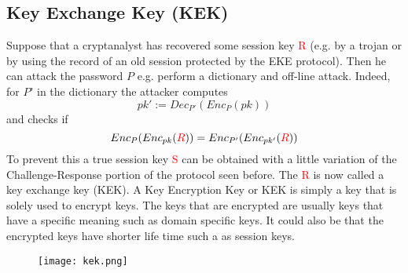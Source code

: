 \documentclass{article}
\begin{document}
\subsection{Key Exchange Key (KEK)}
Suppose that a cryptanalyst has recovered some session key \textcolor{red}{R} (e.g.  by a trojan or by using the record of an old session protected by the EKE protocol).  Then he can attack the password $P$ e.g.  perform a dictionary and off-line attack.  Indeed, for $P’$ in the dictionary the attacker computes
\begin{equation*}
    pk' := Dec_{P'}(Enc_P(pk))
\end{equation*}
and checks if
\begin{equation*}
    Enc_P(Enc_{pk}(\textcolor{red}{R})) = Enc_{P'}(Enc_{pk'}(\textcolor{red}{R}))
\end{equation*}
To prevent this a true session key \textcolor{red}{S} can be obtained with a little variation of the Challenge-Response portion of the protocol seen before.  The \textcolor{red}{R} is now called a key exchange key (KEK).
A Key Encryption Key or KEK is simply a key that is solely used to encrypt keys. The keys that are encrypted are usually keys that have a specific meaning such as domain specific keys. It could also be that the encrypted keys have shorter life time such a as session keys.
\begin{figure} [H]
    \centering
    \texttt{[image: kek.png]}
\end{figure}
\end{document}

